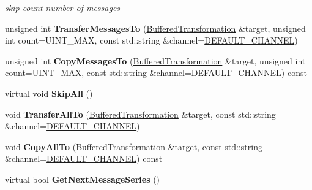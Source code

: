 \begin{DoxyCompactItemize}
\begin{DoxyCompactList}\small\item\em skip count number of messages \item\end{DoxyCompactList}\item 
\hypertarget{class_buffered_transformation_a0446d21781676a6f9c64d0b7a727d314}{
unsigned int {\bfseries TransferMessagesTo} (\hyperlink{class_buffered_transformation}{BufferedTransformation} \&target, unsigned int count=UINT\_\-MAX, const std::string \&channel=\hyperlink{cryptlib_8h_a6f1917f54ea8c2a45de6e08c5087c8de}{DEFAULT\_\-CHANNEL})}
\label{class_buffered_transformation_a0446d21781676a6f9c64d0b7a727d314}

\item 
\hypertarget{class_buffered_transformation_ae09d3275076fa88f22670afd806205bb}{
unsigned int {\bfseries CopyMessagesTo} (\hyperlink{class_buffered_transformation}{BufferedTransformation} \&target, unsigned int count=UINT\_\-MAX, const std::string \&channel=\hyperlink{cryptlib_8h_a6f1917f54ea8c2a45de6e08c5087c8de}{DEFAULT\_\-CHANNEL}) const }
\label{class_buffered_transformation_ae09d3275076fa88f22670afd806205bb}

\item 
\hypertarget{class_buffered_transformation_a8cb3f0946a407461ce0c9fc08d13ca00}{
virtual void {\bfseries SkipAll} ()}
\label{class_buffered_transformation_a8cb3f0946a407461ce0c9fc08d13ca00}

\item 
\hypertarget{class_buffered_transformation_a84c3629cdd9be90695c9701c1b8e24a2}{
void {\bfseries TransferAllTo} (\hyperlink{class_buffered_transformation}{BufferedTransformation} \&target, const std::string \&channel=\hyperlink{cryptlib_8h_a6f1917f54ea8c2a45de6e08c5087c8de}{DEFAULT\_\-CHANNEL})}
\label{class_buffered_transformation_a84c3629cdd9be90695c9701c1b8e24a2}

\item 
\hypertarget{class_buffered_transformation_af055ed9f3d096c9ab627973240608b3c}{
void {\bfseries CopyAllTo} (\hyperlink{class_buffered_transformation}{BufferedTransformation} \&target, const std::string \&channel=\hyperlink{cryptlib_8h_a6f1917f54ea8c2a45de6e08c5087c8de}{DEFAULT\_\-CHANNEL}) const }
\label{class_buffered_transformation_af055ed9f3d096c9ab627973240608b3c}

\item 
\hypertarget{class_buffered_transformation_aeb36a158b63cfd54acbada1a3699598c}{
virtual bool {\bfseries GetNextMessageSeries} ()}
\label{class_buffered_transformation_aeb36a158b63cfd54acbada1a3699598c}


\end{DoxyCompactItemize}
